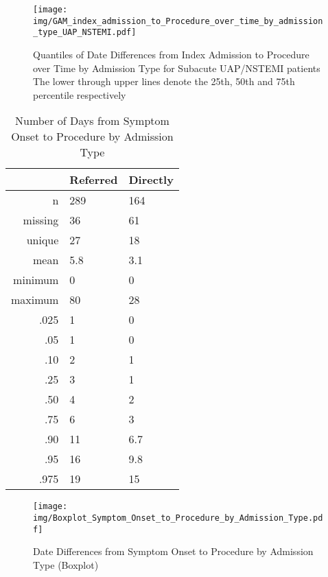 \documentclass[presentation,xcolor=pdftex,dvipsnames,table,11pt]{beamer}
\begin{document}
\begin{tiny}
\begin{frame}
\begin{figure}
  \centering
  \caption{Quantiles of Date Differences from Index Admission to Procedure over Time by Admission Type for Subacute UAP/NSTEMI patients\\
  The lower through upper lines denote the 25th, 50th and 75th percentile respectively}
  \label{GAM: Date Differences from Index Admission to Procedure over Time by Admission Type UAP+NSTEMI}
\texttt{[image: img/GAM\_index\_admission\_to\_Procedure\_over\_time\_by\_admission\_type\_UAP\_NSTEMI.pdf]}\end{figure}
\end{frame}



\begin{table}[ht]
\centering
\begin{tabular}{rll}
  \toprule
 & Referred & Directly \\ 
  \midrule
n & 289 & 164 \\ 
  missing & 36 & 61 \\ 
  unique & 27 & 18 \\ 
  mean & 5.8 & 3.1 \\ 
  minimum & 0 & 0 \\ 
  maximum & 80 & 28 \\ 
  .025 & 1 & 0 \\ 
  .05 & 1 & 0 \\ 
  .10 & 2 & 1 \\ 
  .25 & 3 & 1 \\ 
  .50 & 4 & 2 \\ 
  .75 & 6 & 3 \\ 
  .90 & 11 & 6.7 \\ 
  .95 & 16 & 9.8 \\ 
  .975 & 19 & 15 \\ 
   \bottomrule
\end{tabular}
\caption{Number of Days from Symptom Onset to Procedure by Admission Type} 
\end{table}
\begin{frame}
\begin{figure}
  \centering
  \caption{Date Differences from Symptom Onset to Procedure by Admission Type (Boxplot)}
  \label{Boxplot: Date Differences from Symptom Onset to Procedure by Admission Type}
\texttt{[image: img/Boxplot\_Symptom\_Onset\_to\_Procedure\_by\_Admission\_Type.pdf]}\end{figure}
\end{frame}



\end{tiny}
\end{document}
